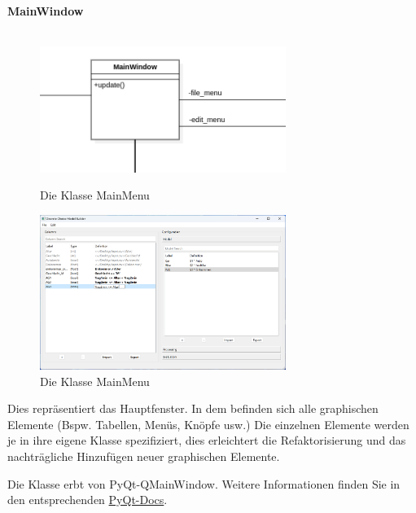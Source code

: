 \documentclass{article}
\begin{document}
\newpage
\textbf{\large{MainWindow}}\\\\
\begin{figure}[H]%
    \centering
    \begin{minipage}[b]{0.4\textwidth}
        \centering
        \includegraphics[width=8cm]{entwurf/Entwurf_dokument/img/Alissa/MainWindow.png}
        \caption{Die Klasse MainMenu}
    \end{minipage}
    \hfill
    \begin{minipage}[b]{0.4\textwidth}
        \includegraphics[width=8cm]{specifications/img/gui-screenshots/columns-editing+model.png}
        \caption{Die Klasse MainMenu}
    \end{minipage}
\end{figure}
Dies repräsentiert das Hauptfenster. In dem befinden sich alle graphischen Elemente (Bspw. Tabellen, Menüs, Knöpfe usw.) Die einzelnen Elemente werden je in ihre eigene Klasse spezifiziert, dies erleichtert die Refaktorisierung und das nachträgliche Hinzufügen neuer graphischen Elemente.

Die Klasse erbt von PyQt-QMainWindow. Weitere Informationen finden Sie in den entsprechenden \href{https://doc.qt.io/qt-6/qmainwindow.html}{PyQt-Docs}.
\newline \newline
\end{document}
